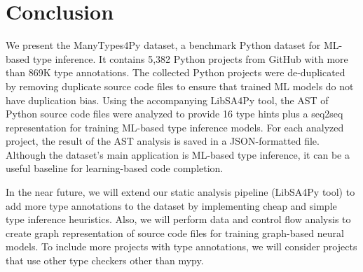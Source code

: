 \documentclass[10pt, conference]{IEEEtran}
\begin{document}
\section{Conclusion}
We present the ManyTypes4Py dataset, a benchmark Python dataset for ML-based type inference. It contains 5,382 Python projects from GitHub with more than 869K type annotations. The collected Python projects were de-duplicated by removing duplicate source code files to ensure that trained ML models do not have duplication bias. Using the accompanying LibSA4Py tool, the AST of Python source code files were analyzed to provide 16 type hints plus a seq2seq representation for training ML-based type inference models. For each analyzed project, the result of the AST analysis is saved in a JSON-formatted file. Although the dataset's main application is ML-based type inference, it can be a useful baseline for learning-based code completion.

In the near future, we will extend our static analysis pipeline (LibSA4Py tool) to add more type annotations to the dataset by implementing cheap and simple type inference heuristics. Also, we will perform data and control flow analysis to create graph representation of source code files for training graph-based neural models. To include more projects with type annotations, we will consider projects that use other type checkers other than mypy.




\end{document}
